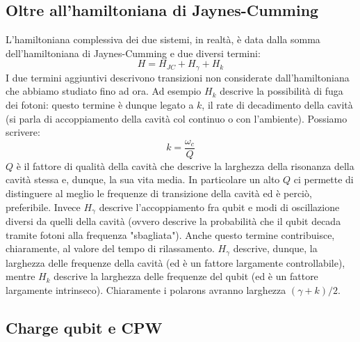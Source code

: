 \subsection{Oltre all'hamiltoniana di Jaynes-Cumming}
L'hamiltoniana complessiva dei due sistemi, in realtà, è data dalla somma dell'hamiltoniana di Jaynes-Cumming e due diversi termini:
\begin{equation*}
    H=H_{JC}+H_\gamma + H_k
\end{equation*}
I due termini aggiuntivi descrivono transizioni non considerate dall'hamiltoniana che abbiamo studiato fino ad ora. Ad esempio $H_k$ descrive la possibilità di fuga dei fotoni: questo termine è dunque legato a $k$, il rate di decadimento della cavità (si parla di accoppiamento della cavità col continuo o con l'ambiente). Possiamo scrivere:
\begin{equation*}
    k = \frac{\omega_c}{Q}
\end{equation*}
$Q$ è il fattore di qualità della cavità che descrive la larghezza della risonanza della cavità stessa e, dunque, la sua vita media. In particolare un alto $Q$ ci permette di distinguere al meglio le frequenze di transizione della cavità ed è perciò, preferibile. 
Invece $H_\gamma$ descrive l'accoppiamento fra qubit e modi di oscillazione diversi da quelli della cavità (ovvero descrive la probabilità che il qubit decada tramite fotoni alla frequenza "sbagliata"). Anche questo termine contribuisce, chiaramente, al valore del tempo di rilassamento.
$H_\gamma$ descrive, dunque, la larghezza delle frequenze della cavità (ed è un fattore largamente controllabile), mentre $H_k$ descrive la larghezza delle frequenze del qubit (ed è un fattore largamente intrinseco). Chiaramente i polarons avranno larghezza $(\gamma+k)/2$. 
\subsection{Charge qubit e CPW}


